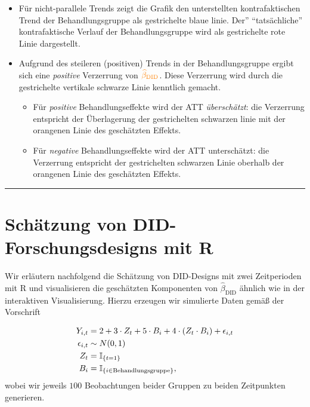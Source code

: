 \documentclass[
  a4paper,
  DIV=11,
  oneside]{scrreprt}
\begin{document}
\begin{itemize}
\item
  Für nicht-parallele Trends zeigt die Grafik den unterstellten
  kontrafaktischen Trend der Behandlungsgruppe als gestrichelte blaue
  linie. Der'' ``tatsächliche'' kontrafaktische Verlauf der
  Behandlungsgruppe wird als gestrichelte rote Linie dargestellt.
\item
  Aufgrund des steileren (positiven) Trends in der Behandlungsgruppe
  ergibt sich eine \emph{positive} Verzerrung von
  \(\color{orange}\widehat{\beta}_\text{DID}\). Diese Verzerrung wird
  durch die gestrichelte vertikale schwarze Linie kenntlich gemacht.

  \begin{itemize}
  \item
    Für \emph{positive} Behandlungseffekte wird der ATT
    \emph{überschätzt}: die Verzerrung entspricht der Überlagerung der
    gestrichelten schwarzen linie mit der orangenen Linie des
    geschätzten Effekts.
  \item
    Für \emph{negative} Behandlungseffekte wird der ATT unterschätzt:
    die Verzerrung entspricht der gestrichelten schwarzen Linie oberhalb
    der orangenen Linie des geschätzten Effekts.
  \end{itemize}
\end{itemize}

\begin{center}\rule{0.5\linewidth}{0.5pt}\end{center}

\section{Schätzung von DID-Forschungsdesigns mit
R}\label{schuxe4tzung-von-did-forschungsdesigns-mit-r}

Wir erläutern nachfolgend die Schätzung von DID-Designs mit zwei
Zeitperioden mit R und visualisieren die geschätzten Komponenten von
\(\widehat{\beta}_\text{DID}\) ähnlich wie in der interaktiven
Visualisierung. Hierzu erzeugen wir simulierte Daten gemäß der
Vorschrift

\begin{align*}
  Y_{i,t} &= 2 + 3 \cdot Z_t + 5 \cdot B_i + 4 \cdot (Z_t \cdot B_i) + \epsilon_{i,t}\\
  \epsilon_{i,t} &\sim N(0, 1)\\
  Z_t &= \mathbb{I}_{\{ t = 1 \}} \\
  B_i &= \mathbb{I}_{\{ i \in \textup{Behandlungsgruppe} \}},
\end{align*} wobei wir jeweils \(100\) Beobachtungen beider Gruppen zu
beiden Zeitpunkten generieren.
\end{document}
